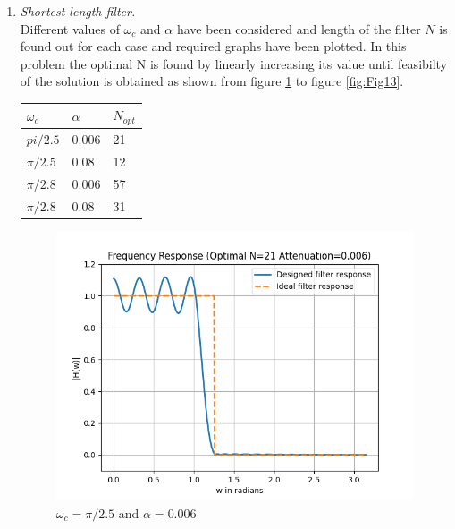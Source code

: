 \documentclass[conference]{IEEEtran}
\begin{document}
\begin{enumerate}[label=(\alph*)]
\item \textit{Shortest length filter.}\\
Different values of $\omega_c$ and $\alpha$ have been considered and length of the filter $N$ is found out for each case and required graphs have been plotted. In this problem the optimal N is found by linearly increasing its value until feasibilty of the solution is obtained as shown from figure \ref{fig:Fig10} to figure \ref{fig:Fig13}.
\vspace{3mm}
\begin{center}
\begin{tabular}{ | m{3em} | m{1cm}| m{1cm} | } 
  \hline
  \textbf{$\omega_c$}& \textbf{$\alpha$} & \textbf{$N_{opt}$}\\ 
  \hline
  $pi/2.5$ & 0.006 & 21 \\ 
  \hline
  $\pi/2.5$ & 0.08 & 12 \\ 
  \hline
  $\pi/2.8$ & 0.006 & 57 \\ 
  \hline
  $\pi/2.8$ & 0.08 & 31\\ 
  \hline
\end{tabular}
\end{center}
\begin{figure}[!h]
	\begin{center} 
	    \includegraphics[width=0.7\columnwidth]{figs/C/w1_a1}
	\end{center}
\caption{$\omega_c=\pi/2.5$ and $\alpha = 0.006$}
\label{fig:Fig10}
\end{figure}


\end{enumerate}
\end{document}
